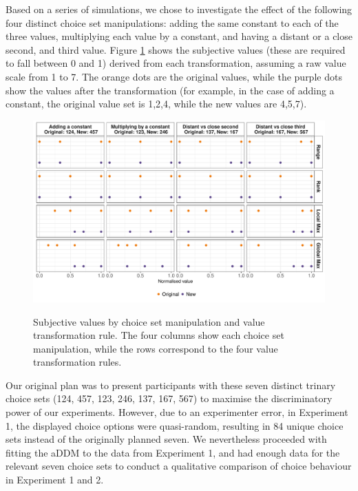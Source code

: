 \documentclass[11pt,a4paper]{article}
\begin{document}
Based on a series of simulations, we chose to investigate the effect of the following four distinct choice set manipulations: adding the same constant to each of the three values, multiplying each value by a constant, and having a distant or a close second, and third value. Figure \ref{fig:choicesetmanip} shows the subjective values (these are required to fall between 0 and 1) derived from each transformation, assuming a raw value scale from 1 to 7. The orange dots are the original values, while the purple dots show the values after the transformation (for example, in the case of adding a constant, the original value set is 1,2,4, while the new values are 4,5,7).

\begin{figure}
\captionsetup{justification=centering}
\centering
\caption{Subjective values by choice set manipulation and value transformation rule. The four columns show each choice set manipulation, while the rows correspond to the four value transformation rules.}
\includegraphics[width=1\textwidth]{explain.pdf}
\label{fig:choicesetmanip}
\end{figure}

Our original plan was to present participants with these seven distinct trinary choice sets (124, 457, 123, 246, 137, 167, 567) to maximise the discriminatory power of our experiments. However, due to an experimenter error, in Experiment 1, the displayed choice options were quasi-random, resulting in 84 unique choice sets instead of the originally planned seven. We nevertheless proceeded with fitting the aDDM to the data from Experiment 1, and had enough data for the relevant seven choice sets to conduct a qualitative comparison of choice behaviour in Experiment 1 and 2.
\end{document}
